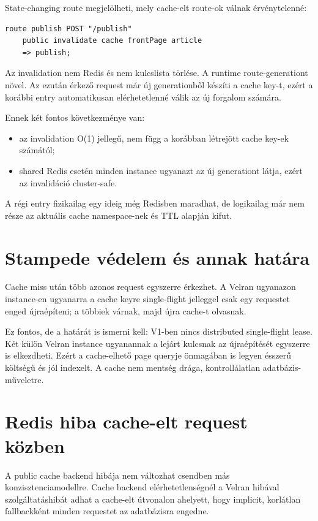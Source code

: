 State-changing route megjelölheti, mely cache-elt route-ok válnak érvénytelenné:

\begin{lstlisting}[language=Velran]
route publish POST "/publish"
    public invalidate cache frontPage article
    => publish;
\end{lstlisting}

Az invalidation nem Redis  és nem kulcslista törlése. A runtime route-generationt növel. Az ezután érkező request már új generationből készíti a cache key-t, ezért a korábbi entry automatikusan elérhetetlenné válik az új forgalom számára.

Ennek két fontos következménye van:

\begin{itemize}
  \item az invalidation O(1) jellegű, nem függ a korábban létrejött cache key-ek számától;
  \item shared Redis esetén minden instance ugyanazt az új generationt látja, ezért az invalidáció cluster-safe.
\end{itemize}

A régi entry fizikailag egy ideig még Redisben maradhat, de logikailag már nem része az aktuális cache namespace-nek és TTL alapján kifut.

\section{Stampede védelem és annak határa}

Cache miss után több azonos request egyszerre érkezhet. A Velran ugyanazon instance-en ugyanarra a cache keyre single-flight jelleggel csak egy requestet enged újraépíteni; a többiek várnak, majd újra cache-t olvasnak.

Ez fontos, de a határát is ismerni kell: V1-ben nincs distributed single-flight lease. Két külön Velran instance ugyanannak a lejárt kulcsnak az újraépítését egyszerre is elkezdheti. Ezért a cache-elhető page queryje önmagában is legyen ésszerű költségű és jól indexelt. A cache nem mentség drága, kontrollálatlan adatbázis-műveletre.

\section{Redis hiba cache-elt request közben}

A public cache backend hibája nem változhat csendben más konzisztenciamodellre. Cache backend elérhetetlenségnél a Velran  hibával szolgáltatáshibát adhat a cache-elt útvonalon ahelyett, hogy implicit, korlátlan fallbackként minden requestet az adatbázisra engedne.

